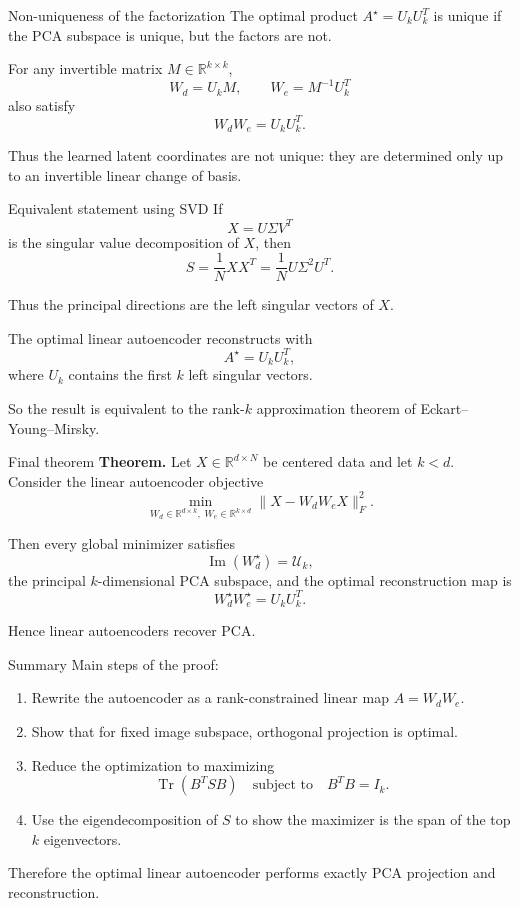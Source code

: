 \documentclass[aspectratio=169]{beamer}
\begin{document}
\begin{frame}{Non-uniqueness of the factorization}
The optimal product \(A^\star = U_kU_k^T\) is unique if the PCA subspace is unique, but the factors are not.

For any invertible matrix \(M\in \mathbb{R}^{k\times k}\),
\[
W_d = U_k M,
\qquad
W_e = M^{-1} U_k^T
\]
also satisfy
\[
W_dW_e = U_kU_k^T.
\]

Thus the learned latent coordinates are not unique:
they are determined only up to an invertible linear change of basis.
\end{frame}

\begin{frame}{Equivalent statement using SVD}
If
\[
X = U \Sigma V^T
\]
is the singular value decomposition of \(X\), then
\[
S = \frac1N XX^T = \frac1N U\Sigma^2 U^T.
\]

Thus the principal directions are the left singular vectors of \(X\).

The optimal linear autoencoder reconstructs with
\[
A^\star = U_kU_k^T,
\]
where \(U_k\) contains the first \(k\) left singular vectors.

So the result is equivalent to the rank-\(k\) approximation theorem of Eckart--Young--Mirsky.
\end{frame}

\begin{frame}{Final theorem}
\textbf{Theorem.}
Let \(X\in \mathbb{R}^{d\times N}\) be centered data and let \(k<d\).
Consider the linear autoencoder objective
\[
\min_{W_d\in\mathbb{R}^{d\times k},\; W_e\in\mathbb{R}^{k\times d}}
\|X-W_dW_eX\|_F^2.
\]

Then every global minimizer satisfies
\[
\operatorname{Im}(W_d^\star)=\mathcal U_k,
\]
the principal \(k\)-dimensional PCA subspace, and the optimal reconstruction map is
\[
W_d^\star W_e^\star = U_kU_k^T.
\]

Hence linear autoencoders recover PCA.
\end{frame}

\begin{frame}{Summary}
Main steps of the proof:
\begin{enumerate}
\item Rewrite the autoencoder as a rank-constrained linear map \(A=W_dW_e\).
\item Show that for fixed image subspace, orthogonal projection is optimal.
\item Reduce the optimization to maximizing
\[
\operatorname{Tr}(B^TSB)
\quad \text{subject to} \quad B^TB=I_k.
\]
\item Use the eigendecomposition of \(S\) to show the maximizer is the span of the top \(k\) eigenvectors.
\end{enumerate}

Therefore the optimal linear autoencoder performs exactly PCA projection and reconstruction.
\end{frame}
\end{document}
